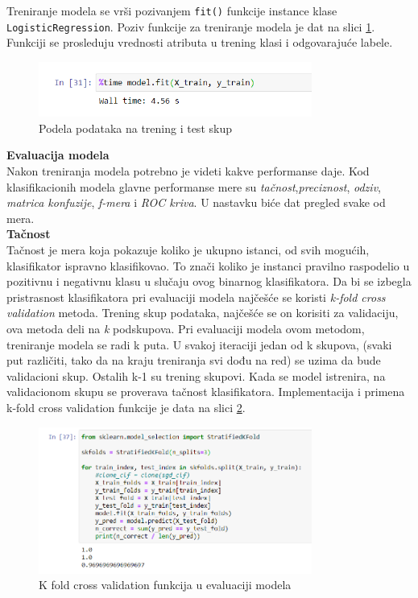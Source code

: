 \documentclass[a4paper,12pt]{report}
\begin{document}
Treniranje modela se vrši pozivanjem \texttt{fit()} funkcije instance klase \texttt{LogisticRegression}. Poziv funkcije za treniranje modela je dat na slici \ref{fig:logisticfitcall}. Funkciji se prosleduju vrednosti atributa u trening klasi i odgovarajuće labele. 

\begin{figure}[h]
    \centering
    \includegraphics[width=0.8\textwidth]{logistic_fitcall.png}
    \caption{Podela podataka na trening i test skup}\label{fig:logisticfitcall}
\end{figure}

\textbf{Evaluacija modela}\\

Nakon treniranja modela potrebno je videti kakve performanse daje. Kod klasifikacionih modela glavne performanse mere su \textit{tačnost},\textit{preciznost}, \textit{odziv}, \textit{matrica konfuzije}, \textit{f-mera} i \textit{ROC kriva}. U nastavku biće dat pregled svake od mera. \\

\textbf{Tačnost}\\

Tačnost je mera koja pokazuje koliko je ukupno istanci, od svih mogućih, klasifikator ispravno klasifikovao. To znači koliko je instanci pravilno raspodelio u pozitivnu i negativnu klasu u slučaju ovog binarnog klasifikatora. Da bi se izbegla pristrasnost klasifikatora pri evaluaciji modela najčešće se  koristi \textit{k-fold cross validation} metoda. Trening skup podataka, najčešće se on korisiti za validaciju, ova metoda deli na \textit{k} podskupova. Pri evaluaciji modela ovom metodom, treniranje modela se radi k puta. U svakoj iteraciji jedan od k skupova, (svaki put različiti, tako da na kraju treniranja svi dođu na red) se uzima da bude validacioni skup. Ostalih k-1 su trening skupovi. Kada se model istrenira, na validacionom skupu se proverava tačnost klasifikatora. Implementacija i primena k-fold cross validation funkcije je data na slici \ref{fig:logisticprecission}.

\begin{figure}[h]
    \centering
    \includegraphics[width=0.8\textwidth]{logistic_precision.png}
    \caption{K fold cross validation funkcija u evaluaciji modela}\label{fig:logisticprecission}
\end{figure}
\end{document}
